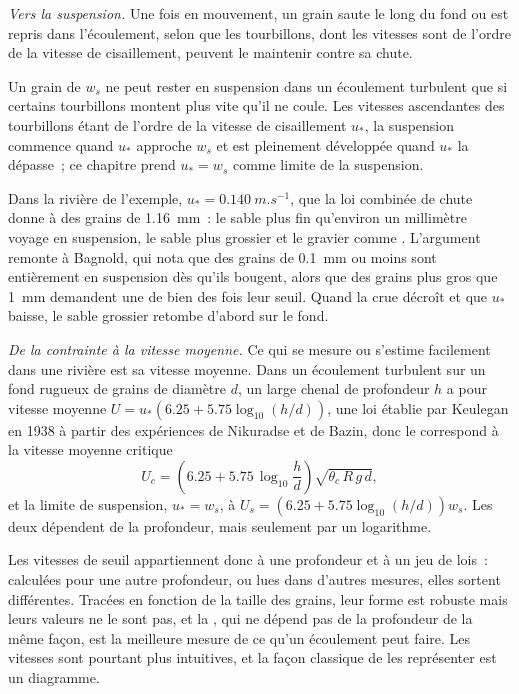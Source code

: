 \emph{Vers la suspension.} Une fois en mouvement, un grain saute le long du fond ou est repris
dans l'écoulement, selon que les tourbillons, dont les vitesses sont de l'ordre
de la vitesse de cisaillement, peuvent le maintenir contre sa chute.

\begin{proposition}\label{prop:b1:erosion-transport:suspension}
Un grain de  $w_s$ ne peut rester en suspension dans un écoulement turbulent
que si certains tourbillons montent plus vite qu'il ne coule. Les vitesses ascendantes des
tourbillons étant de l'ordre de la vitesse de cisaillement $u_*$, la suspension commence quand
$u_*$ approche $w_s$ et est pleinement développée quand $u_*$ la dépasse~; ce
chapitre prend $u_* = w_s$ comme limite de la suspension.
\end{proposition}
\admitted

Dans la rivière de l'exemple, $u_* = \qty{0.140}{m.s^{-1}}$, que la loi combinée
de chute donne à des grains de \qty{1.16}{mm}~: le sable plus fin qu'environ un
millimètre voyage en suspension, le sable plus grossier et le gravier comme .
L'argument remonte à Bagnold, qui nota que des grains de \qty{0.1}{mm} ou
moins sont entièrement en suspension dès qu'ils bougent, alors que des grains plus gros que
\qty{1}{mm} demandent une  de bien des fois leur seuil. Quand
la crue décroît et que $u_*$ baisse, le sable grossier retombe d'abord sur le fond.

\emph{De la contrainte à la vitesse moyenne.} Ce qui se mesure ou s'estime facilement dans
une rivière est sa vitesse moyenne. Dans un écoulement turbulent sur un fond rugueux
de grains de diamètre $d$, un large chenal de profondeur $h$ a pour vitesse moyenne
$U = u_*\left(6.25 + 5.75\log_{10}(h/d)\right)$, une loi établie par Keulegan
en 1938 à partir des expériences de Nikuradse et de Bazin, donc le 
correspond à la vitesse moyenne critique
\[
  U_c = \left(6.25 + 5.75\,\log_{10}\frac{h}{d}\right)\sqrt{\theta_c\,R\,g\,d},
\]
et la limite de suspension, $u_* = w_s$, à $U_s = \left(6.25 +
5.75\log_{10}(h/d)\right) w_s$. Les deux dépendent de la profondeur, mais seulement par un
logarithme.

Les vitesses de seuil appartiennent donc à une profondeur et à un jeu de lois~:
calculées pour une autre profondeur, ou lues dans d'autres mesures, elles sortent
différentes. Tracées en fonction de la taille des grains, leur forme est robuste mais leurs
valeurs ne le sont pas, et la , qui ne dépend pas de la profondeur de
la même façon, est la meilleure mesure de ce qu'un écoulement peut faire. Les vitesses sont
pourtant plus intuitives, et la façon classique de les représenter est un diagramme.

